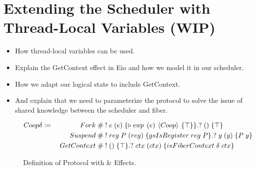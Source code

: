 \section{Extending the Scheduler with Thread-Local Variables (WIP)}
\label{sec:thread-local-vars}

\begin{itemize}
  \item How thread-local variables can be used.
  \item Explain the GetContext effect in Eio and how we model it in our scheduler.
  \item How we adapt our logical state to include GetContext.
  \item And explain that we need to parameterize the protocol to solve the issue of shared knowledge between the scheduler and fiber.
\end{itemize}

\begin{figure}[ht]
  \begin{alignat*}{2}
    Coop \delta \coloneqq\; &  & \quad Fork\; \#    & \; !\; e\; (e)\; \{\later \ewp{e}{Coop}{\top}\}. ?\; ()\; \{ \top \}          \\
                            &  & Suspend\;    \#    & \; !\; reg\; P\; (reg)\; \{gsIsRegister\; reg\; P\}.?\; y\; (y)\; \{ P\; y \} \\
                            &  & GetContext\;    \# & \; !\; ()\; \{\top\}.?\; ctx\; (ctx)\; \{ isFiberContext\; \delta\; ctx \}
  \end{alignat*}
  \caption{Definition of \proto{} Protocol with \efork{} \& \esuspend{} Effects.}
  \label{fig:coop-protocol-ext}
\end{figure}



